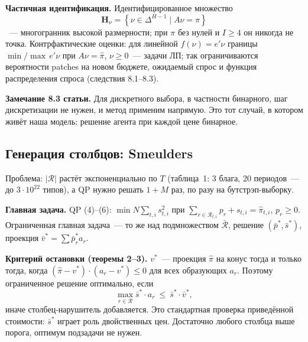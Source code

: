 \documentclass[a4paper,11pt]{article}
\theoremstyle{plain}
\theoremstyle{definition}
\theoremstyle{remark}
\newcommand{\set}[1]{\left\{ #1 \right\}}
\begin{document}
\textbf{Частичная идентификация.} Идентифицированное множество
\[
    \mathbf H_\nu=\set{\nu\in\Delta^{H-1}\mid A\nu=\pi}
\]
~--- многогранник высокой размерности; при $\pi$ без нулей и $I\ge4$ он никогда не точка. Контрфактические оценки: для линейной $f(\nu)=e'\nu$ границы $\min/\max\,e'\nu$ при $A\nu=\hat\pi$, $\nu\ge0$~--- задачи ЛП; так ограничиваются вероятности patches на новом бюджете, ожидаемый спрос и функция распределения спроса (следствия 8.1--8.3).

\textbf{Замечание 8.3 статьи.} Для дискретного выбора, в частности бинарного, шаг дискретизации не нужен, и метод применим напрямую. Это тот случай, в котором живёт наша модель: решение агента при каждой цене бинарное.

\subsection{Генерация столбцов: Smeulders}

Проблема: $|\mathcal R|$ растёт экспоненциально по $T$ (таблица~1: 3 блага, 20 периодов~--- до $3\cdot10^{22}$ типов), а QP нужно решать $1+M$ раз, по разу на бутстрэп-выборку.

\textbf{Главная задача.} QP (4)--(6): $\min N\sum_{t,i}s_{t,i}^2$ при $\sum_{r\in\mathcal R_{t,i}}p_r+s_{t,i}=\hat\pi_{t,i}$, $p_r\ge0$. Ограниченная главная задача~--- то же над подмножеством $\bar{\mathcal R}$, решение $(\bar p^*,\bar s^*)$, проекция $\bar v^*=\sum\bar p^*_ra_r$.

\textbf{Критерий остановки (теоремы 2--3).} $v^*$~--- проекция $\hat\pi$ на конус тогда и только тогда, когда $(\hat\pi-v^*)\cdot(a_r-v^*)\le0$ для всех образующих $a_r$. Поэтому ограниченное решение оптимально, если
\[
    \max_{r\in\mathcal R}\bar s^*\cdot a_r\ \le\ \bar s^*\cdot\bar v^*,\tag{11}
\]
иначе столбец-нарушитель добавляется. Это стандартная проверка приведённой стоимости: $\bar s^*$ играет роль двойственных цен. Достаточно любого столбца выше порога, оптимум подзадачи не нужен.
\end{document}

